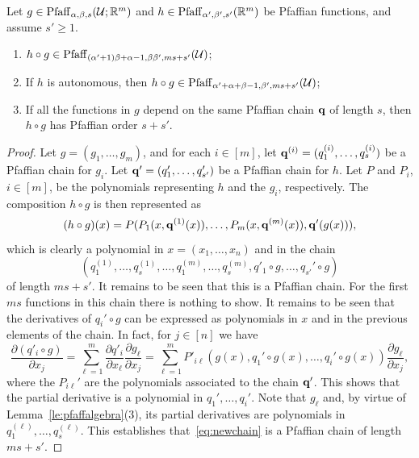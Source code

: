 \begin{lemma}\label{le:composition}
Let $g\in \mathrm{Pfaff}_{\alpha,\beta,s}(\mathcal{U};\mathbb{R}^m)$ and $h\in \mathrm{Pfaff}_{\alpha',\beta',s'}(\mathbb{R}^m)$ be Pfaffian functions, and assume $s'\geq 1$. 
\begin{enumerate}
\item $h\circ g \in \mathrm{Pfaff}_{(\alpha'+1)\beta+\alpha-1, \beta\beta', ms+s'}(\mathcal{U})$;
\item If $h$ is autonomous, then $h\circ g \in \mathrm{Pfaff}_{\alpha'+\alpha+\beta-1,\beta', ms+s'}(\mathcal{U})$;
\item If all the functions in $g$ depend on the same Pfaffian chain $\mathbf{q}$ of length $s$, then $h\circ g$ has Pfaffian order $s+s'$.
\end{enumerate}
\end{lemma}

\begin{proof}
Let $g=(g_1,\dots,g_m)$, and for each $i\in [m]$, let $\mathbf{q}^{(i)}=(q_1^{(i)},\dots,q_s^{(i)})$ be a Pfaffian chain for $g_i$. Let $\mathbf{q}'=(q_1',\dots,q_{s'}')$ be a Pfaffian chain for $h$. Let $P$ and $P_i$, $i\in [m]$, be the polynomials representing $h$ and the $g_i$, respectively. The composition $h\circ g$ is then represented as 
\begin{equation}\label{eq:longpoly}
 (h\circ g)(x) = P(P_1(x,\mathbf{q}^{(1)}(x)),\dots,P_m(x,\mathbf{q}^{(m)}(x)),\mathbf{q}'(g(x))),
\end{equation}
which is clearly a polynomial in $x=(x_1,\dots,x_n)$ and in the chain
\begin{equation}\label{eq:newchain}
  (q_1^{(1)},\dots,q_s^{(1)},\dots,q_1^{(m)},\dots,q_s^{(m)},q'_1\circ g,\dots,q_{s'}'\circ g)
\end{equation}
of length $ms+s'$. It remains to be seen that this is a Pfaffian chain. For the first $ms$ functions in this chain there is nothing to show. It remains to be seen that the derivatives of $q_i'\circ g$ can be expressed as polynomials in $x$ and in the previous elements of the chain. In fact, for $j\in [n]$ we have
\begin{equation}\label{eq:composite}
  \frac{\partial (q'_i\circ g)}{\partial x_j} = \sum_{\ell=1}^m \frac{\partial q'_i}{\partial x_\ell}\frac{\partial g_\ell}{\partial x_j} = \sum_{\ell=1}^m P'_{i\ell}(g(x),q_1'\circ g(x),\dots,q_i'\circ g(x))  \frac{\partial g_\ell}{\partial x_j},
\end{equation}
where the $P_{i\ell}'$ are the polynomials associated to the chain $\mathbf{q}'$. 
This shows that the partial derivative is a polynomial in $q_1',\dots,q_i'$. 
Note that $g_{\ell}$ and, by virtue of Lemma~\ref{le:pfaffalgebra}(3), its partial derivatives are polynomials in $q_1^{(\ell)},\dots,q_s^{(\ell)}$. This establishes that~\eqref{eq:newchain} is a Pfaffian chain of length $ms+s'$. 


\end{proof}
